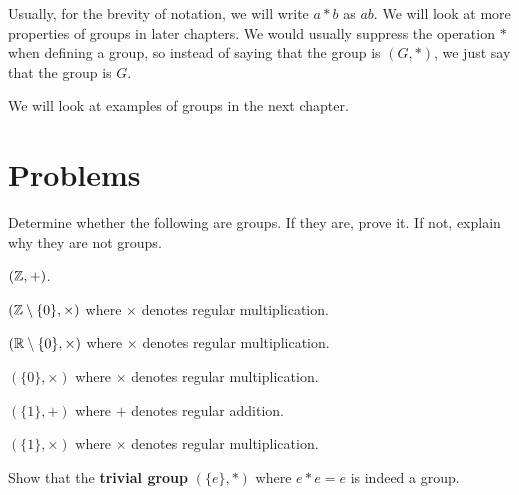 Usually, for the brevity of notation, we will write $a \ast b$ as $ab$. We will look at more properties of groups in later chapters. We would usually suppress the operation $\ast$ when defining a group, so instead of saying that the group is $(G, \ast)$, we just say that the group is $G$.

We will look at examples of groups in the next chapter.

\newpage

\section{Problems}
\begin{problem}
Determine whether the following are groups. If they are, prove it. If not, explain why they are not groups.
\begin{partquestions}{\alph*}
    \item $(\mathbb{Z}, +)$.
    \item $(\mathbb{Z} \setminus \{0\}, \times)$ where $\times$ denotes regular multiplication.
    \item $(\mathbb{R} \setminus \{0\}, \times)$ where $\times$ denotes regular multiplication.
    \item $(\{0\}, \times)$ where $\times$ denotes regular multiplication.
    \item $(\{1\}, +)$ where $+$ denotes regular addition.
    \item $(\{1\}, \times)$ where $\times$ denotes regular multiplication.
\end{partquestions}
\end{problem}

\begin{problem}
    Show that the \textbf{trivial group} $(\{e\}, *)$ where $e \ast e = e$ is indeed a group.
\end{problem}
